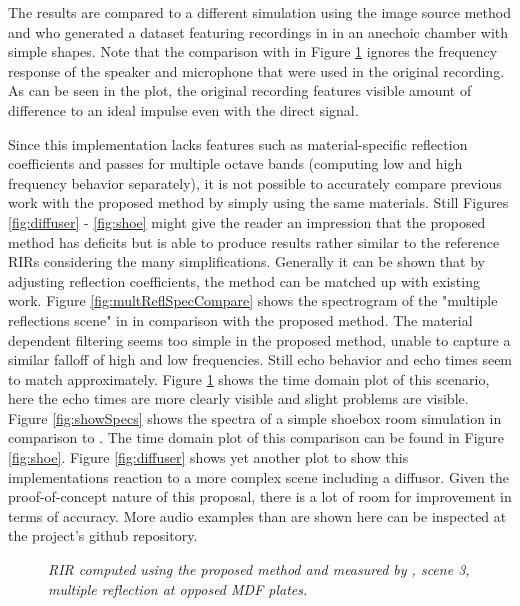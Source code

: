 \documentclass[twoside,a4paper]{article}
\begin{document}
The results are compared to a different simulation using the image source method \cite{lehmann_fast_2020} and \cite{brinkmann_round_2019} who generated a dataset featuring recordings in in an anechoic chamber with simple shapes. Note that the comparison with \cite{brinkmann_round_2019} in Figure \ref{fig:multRefl} ignores the frequency response of the speaker and microphone that were used in the original recording. As can be seen in the plot, the original recording features visible amount of difference to an ideal impulse even with the direct signal. 

Since this implementation lacks features such as material-specific reflection coefficients and passes for multiple octave bands (computing low and high frequency behavior separately), it is not possible to accurately compare previous work with the proposed method by simply using the same materials. Still Figures \ref{fig:diffuser} - \ref{fig:shoe} might give the reader an impression that the proposed method has deficits but is able to produce results rather similar to the reference RIRs considering the many simplifications. Generally it can be shown that by adjusting reflection coefficients, the method can be matched up with existing work. Figure \ref{fig:multReflSpecCompare} shows the spectrogram of the "multiple reflections scene" in \cite{brinkmann_round_2019} in comparison with the proposed method. The material dependent filtering seems too simple in the proposed method, unable to capture a similar falloff of high and low frequencies. Still echo behavior and echo times seem to match approximately. Figure \ref{fig:multRefl} shows the time domain plot of this scenario, here the echo times are more clearly visible and slight problems are visible.
Figure \ref{fig:showSpecs} shows the spectra of a simple shoebox room simulation in comparison to \cite{lehmann_fast_2020}. The time domain plot of this comparison can be found in Figure \ref{fig:shoe}.
Figure \ref{fig:diffuser} shows yet another plot to show this implementations reaction to a more complex scene including a diffusor. 
Given the proof-of-concept nature of this proposal, there is a lot of room for improvement in terms of accuracy. More audio examples than are shown here can be inspected at the project's github repository.
\begin{figure}

    \begin{center}
      
    \end{center}
    
    \caption{\label{fig:multRefl} \it RIR computed using the proposed method and measured by \cite{brinkmann_round_2019}, scene 3, multiple reflection at opposed MDF plates.}
\end{figure}
\end{document}
